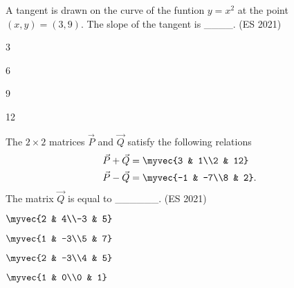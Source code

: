 \item A tangent is drawn on the curve of the funtion $y = x^2$ at the point $(x,y)=(3,9)$. The slope of the tangent is \_\_\_\_.
\hfill(ES 2021)
\begin{enumerate}
\begin{multicols}{4}
\item 3
\item 6
\item 9
\item 12
\end{multicols}
\end{enumerate}
\item The $2\times2$ matrices $\vec{P}$ and $\vec{Q}$ satisfy the following relations
	\begin{align}
		\vec{P} + \vec{Q} &= \myvec{3 & 1\\2 & 12}
\\
		\vec{P}-\vec{Q} &= \myvec{-1 & -7\\8 & 2}.
\end{align}
The matrix $\vec{Q}$ is equal to \_\_\_\_\_\_. \hfill(ES 2021)
\begin{enumerate}
\begin{multicols}{4}
    \item $\myvec{2 & 4\\-3 & 5}$
    \item $\myvec{1 & -3\\5 & 7}$
    \item $\myvec{2 & -3\\4 & 5}$
    \item $\myvec{1 & 0\\0 & 1}$
    \end{multicols}
\end{enumerate}

